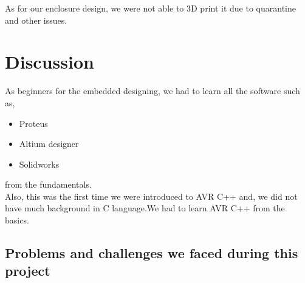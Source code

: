 As for our enclosure design, we were not able to 3D print it due to quarantine and other issues.\\
\begin{minipage}{0.97\textwidth}
 \noindent{}\hfill
\end{minipage}
\newpage
\chapter{Discussion}
As beginners for the embedded designing, we had to learn all the software such as,
\begin{itemize}

\item Proteus
\item Altium designer
\item Solidworks 

\end{itemize}

from the fundamentals.\\
Also, this was the first time we were introduced to AVR C++ and, we did not have much background in C language.We had to learn AVR C++ from the basics.

\section{Problems and challenges we faced during this project}

